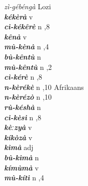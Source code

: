 \begin{multicols}{2}
{{\itshape zì-gébéngà}} \relax  Lozi \relax  \\
{{\bfseries\itshape kékèrà}} \relax  v  \relax  {} \relax   \relax  \\
{{\bfseries\itshape cì-kékêrè}} \relax  n  ,8  \relax   \relax  \\
{{\bfseries\itshape kênà}} \relax  v  \relax   \relax  {} \relax   \relax  \\
{{\bfseries\itshape mù-kènà}} \relax  n  ,4  \relax   \relax  \\
{{\bfseries\itshape bù-kêntù}} \relax  n   \relax  {} \relax   \relax  \\
{{\bfseries\itshape mù-kêntù}} \relax  n  ,2  \relax   \relax  \\
{{\bfseries\itshape cì-kérè}} \relax  n  ,8  \relax   \relax  \\
{{\bfseries\itshape n-kèrékè}} \relax  n  ,10  \relax  Afrikaans \relax  \\
{{\bfseries\itshape n-kèrézò}} \relax  n  ,10  \relax   \relax  \\
{{\bfseries\itshape rù-késhà}} \relax  n   \relax  {} \relax   \relax  \\
{{\bfseries\itshape cì-kèsì}} \relax  n  ,8  \relax   \relax  \\
{{\bfseries\itshape kèːzyà}} \relax  v  \relax   \relax  {} \relax   \relax  \\
{{\bfseries\itshape kíkòzà}} \relax  v  \relax   \relax  {} \relax   \relax  \\
{{\bfseries\itshape kìmà}} \relax  adj  \relax   \relax  {} \relax   \relax  \\
{{\bfseries\itshape bù-kìmà}} \relax  n   \relax  {} \relax   \relax  \\
{{\bfseries\itshape kímùmà}} \relax  v  \relax   \relax  {} \relax   \relax  \\
{{\bfseries\itshape mù-kítì}} \relax  n  ,4  \relax   \relax  \\

\end{multicols}
